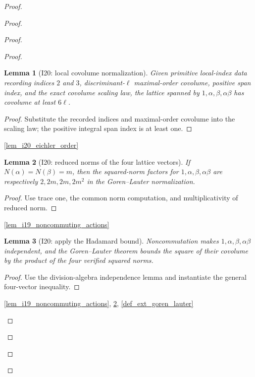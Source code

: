 \documentclass[11pt,a4paper]{article}
\numberwithin{equation}{section}
\theoremstyle{plain}\newtheorem{theorem}{Theorem}[section]\newaliascnt{proposition}{theorem}\newtheorem{proposition}[proposition]{Proposition}\aliascntresetthe{proposition}\newaliascnt{lemma}{theorem}\newtheorem{lemma}[lemma]{Lemma}\aliascntresetthe{lemma}
\theoremstyle{definition}\newaliascnt{definition}{theorem}\newtheorem{definition}[definition]{Definition}\aliascntresetthe{definition}\newaliascnt{notation}{theorem}\newtheorem{notation}[notation]{Notation}\aliascntresetthe{notation}
\providecommand{\lean}[1]{}\providecommand{\leanok}{}
\begin{document}
\begin{proof}
\begin{proof}
\begin{proof}
\begin{proof}
\begin{lemma}[I20: local covolume normalization]\label{lem_i20_local_covolume}\lean{SptCM.Repair.levelSix_local_covolume_lower}\leanok
Given primitive local-index data recording indices $2$ and $3$, discriminant-$\ell$ maximal-order covolume, positive span index, and the exact covolume scaling law, the lattice spanned by $1,\alpha,\beta,\alpha\beta$ has covolume at least $6\ell$.
\end{lemma}
\begin{proof}Substitute the recorded indices and maximal-order covolume into the scaling law; the positive integral span index is at least one.\end{proof}
\begin{uses-proof}\ref{lem_i20_eichler_order}\end{uses-proof}

\begin{lemma}[I20: reduced norms of the four lattice vectors]\label{lem_i20_norm_table}\lean{SptCM.Repair.reducedNorm_squaredNorm_table}\leanok
If $N(\alpha)=N(\beta)=m$, then the squared-norm factors for $1,\alpha,\beta,\alpha\beta$ are respectively $2,2m,2m,2m^2$ in the Goren--Lauter normalization.
\end{lemma}
\begin{proof}Use trace one, the common norm computation, and multiplicativity of reduced norm.\end{proof}
\begin{uses-proof}\ref{lem_i19_noncommuting_actions}\end{uses-proof}

\begin{lemma}[I20: apply the Hadamard bound]\label{lem_i20_hadamard_application}\lean{SptCM.Repair.gorenLauter_hadamard_of_noncommuting}\leanok
Noncommutation makes $1,\alpha,\beta,\alpha\beta$ independent, and the Goren--Lauter theorem bounds the square of their covolume by the product of the four verified squared norms.
\end{lemma}
\begin{proof}Use the division-algebra independence lemma and instantiate the general four-vector inequality.\end{proof}
\begin{uses-proof}\ref{lem_i19_noncommuting_actions}, \ref{lem_i20_norm_table}, \ref{def_ext_goren_lauter}\end{uses-proof}


\end{proof}
\end{proof}
\end{proof}
\end{proof}
\end{document}
